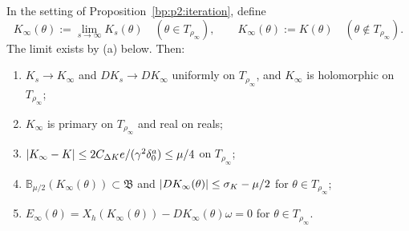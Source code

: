 \begin{proposition}\label{bp:p2:limit}
In the setting of Proposition~\ref{bp:p2:iteration}, define
\[
K_\infty(\theta):=\lim_{s\to\infty}K_s(\theta)\quad(\theta\in T_{\rho_\infty}),\qquad
K_\infty(\theta):=K(\theta)\quad(\theta\notin T_{\rho_\infty}).
\]
The limit exists by (a) below. Then:
\begin{enumerate}[label=(\alph*)]
\item $K_s\to K_\infty$ and $DK_s\to DK_\infty$ uniformly on $T_{\rho_\infty}$, and $K_\infty$ is
  holomorphic on $T_{\rho_\infty}$;
\item $K_\infty$ is primary on $T_{\rho_\infty}$ and real on reals;
\item $\lvert K_\infty-K\rvert\le2C_{\Delta K}e/(\gamma^2\delta_0^a)\le\mu/4$ on $T_{\rho_\infty}$;
\item $\mathbb B_{\mu/2}(K_\infty(\theta))\subset\mathfrak B$ and $\lvert DK_\infty(\theta)\rvert\le\sigma_K-\mu/2$
  for $\theta\in T_{\rho_\infty}$;
\item $E_\infty(\theta)=X_h(K_\infty(\theta))-DK_\infty(\theta)\omega=0$ for $\theta\in T_{\rho_\infty}$.
\end{enumerate}
\end{proposition}

